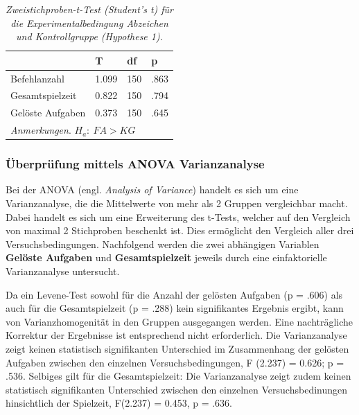 \begin{table}[htbp]
\centering
\caption{\textit{Zweistichproben-t-Test (Student's t) für die Experimentalbedingung Abzeichen und Kontrollgruppe (Hypothese 1).}}
\begin{tabular}{  p{4cm} p{2.0cm} p{2.0cm} p{2.0cm}  }
 \hline
 & T &df & p \\
 \hline
  Befehlanzahl       & 1.099   &   150 & .863\\
  Gesamtspielzeit    & 0.822   &   150 & .794\\
  Gelöste Aufgaben   & 0.373   &   150 & .645\\
 \hline
 \multicolumn{4}{l}{%
 \small%
\textit{Anmerkungen}. $H_a:\: FA > KG$
}\\
\end{tabular}
\label{ttest_hypo_2}
\end{table}





\subsubsection{Überprüfung mittels ANOVA Varianzanalyse }
Bei der ANOVA (engl. \textit{Analysis of Variance}) handelt es sich um eine Varianzanalyse, die die Mittelwerte von mehr als 2 Gruppen vergleichbar macht. Dabei handelt es sich um eine Erweiterung des t-Tests, welcher auf den Vergleich von maximal 2 Stichproben beschenkt ist. Dies ermöglicht den Vergleich aller drei Versuchsbedingungen. Nachfolgend werden die zwei abhängigen Variablen \textbf{Gelöste Aufgaben} und \textbf{Gesamtspielzeit} jeweils durch eine einfaktorielle Varianzanalyse untersucht.

Da ein Levene-Test sowohl für die Anzahl der gelösten Aufgaben (p = .606) als auch für die Gesamtspielzeit (p = .288) kein signifikantes Ergebnis ergibt, kann von Varianzhomogenität in den Gruppen ausgegangen werden. Eine nachträgliche Korrektur der Ergebnisse ist entsprechend nicht erforderlich. Die Varianzanalyse zeigt keinen statistisch signifikanten Unterschied im Zusammenhang der gelösten Aufgaben zwischen den einzelnen Versuchsbedingungen, F (2.237) = 0.626; p = .536. Selbiges gilt für die Gesamtspielzeit: Die Varianzanalyse zeigt zudem keinen statistisch  signifikanten Unterschied zwischen den einzelnen Versuchsbedinungen hinsichtlich der Spielzeit,  F(2.237) = 0.453, p = .636.


